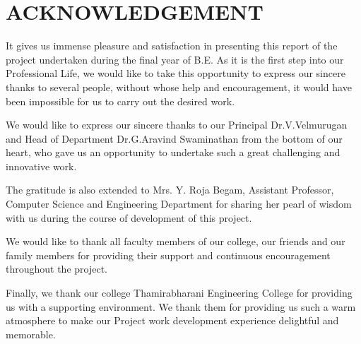 \chapter*{ACKNOWLEDGEMENT}
It gives us immense pleasure and satisfaction in presenting this report of the project undertaken during the final year of B.E. As it is the first step into our Professional Life, we would like to take this opportunity to express our sincere thanks to several people, without whose help and encouragement, it would have been impossible for us to carry out the desired work.

We would like to express our sincere thanks to our Principal Dr.V.Velmurugan and Head of Department Dr.G.Aravind Swaminathan from the bottom of our heart, who gave us an opportunity to undertake such a great challenging and innovative work.

The gratitude is also extended to Mrs. Y. Roja Begam, Assistant Professor, Computer Science and Engineering Department for sharing her pearl of wisdom with us during the course of development of this project.

We would like to thank all faculty members of our college, our friends and our family members for providing their support and continuous encouragement throughout the project. 

Finally, we thank our college Thamirabharani Engineering College for providing us with a supporting environment. We thank them for providing us such a warm atmosphere to make our Project work development experience delightful and memorable. 
